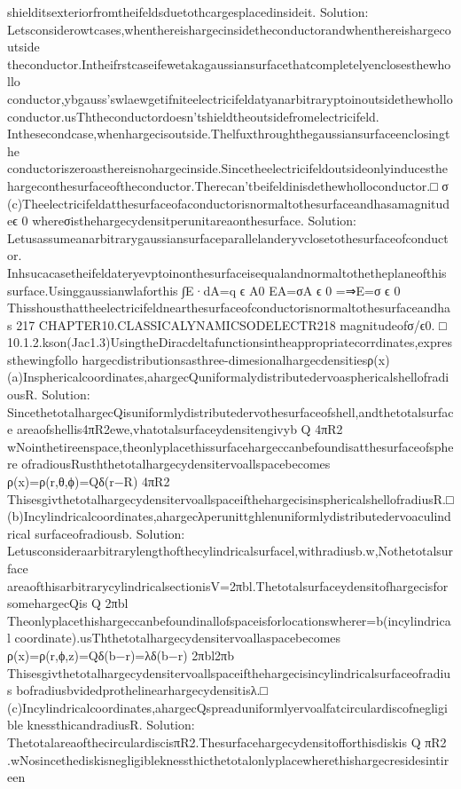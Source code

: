 {{{{{{{{{{{shielditsexteriorfromtheifeldsduetothcargesplacedinsideit.
Solution:
Letsconsiderowtcases,whenthereishargecinsidetheconductorandwhenthereishargecoutside
theconductor.Intheifrstcaseifewetakagaussiansurfacethatcompletelyenclosesthewhollo
conductor,ybgauss’swlaewgetifniteelectricifeldatyanarbitraryptoinoutsidethewhollo
conductor.usThtheconductordoesn’tshieldtheoutsidefromelectricifeld.
Inthesecondcase,whenhargecisoutside.Thelfuxthroughthegaussiansurfaceenclosingthe
conductoriszeroasthereisnohargecinside.Sincetheelectricifeldoutsideonlyinducesthe
hargeconthesurfaceoftheconductor.Therecan’tbeifeldinisdethewholloconductor.□
σ
(c)Theelectricifeldatthesurfaceofaconductorisnormaltothesurfaceandhasamagnitudeϵ
0
whereσisthehargecydensitperunitareaonthesurface.
Solution:
Letusassumeanarbitrarygaussiansurfaceparallelanderyvclosetothesurfaceofconductor.
Inhsucacasetheifeldateryevptoinonthesurfaceisequalandnormaltothetheplaneofthis
surface.Usinggaussianwlaforthis
∫E·dA=q
ϵ
A0
EA=σA
ϵ
0
=⇒E=σ
ϵ
0
Thisshousthattheelectricifeldnearthesurfaceofconductorisnormaltothesurfaceandhas
217
CHAPTER10.CLASSICALYNAMICSODELECTR218
magnitudeofσ/ϵ0.
□
10.1.2.kson(Jac1.3)UsingtheDiracdeltafunctionsintheappropriatecorrdinates,expressthewingfollo
hargecdistributionsasthree-dimesionalhargecdensitiesρ(x)
(a)Insphericalcoordinates,ahargecQuniformalydistributedervoasphericalshellofradiousR.
Solution:
SincethetotalhargecQisuniformlydistributedervothesurfaceofshell,andthetotalsurface
areaofshellis4πR2ewe,vhatotalsurfaceydensitengivyb
Q
4πR2
wNointhetireenspace,theonlyplacethissurfacehargeccanbefoundisatthesurfaceofsphere
ofradiousRusththetotalhargecydensitervoallspacebecomes
ρ(x)=ρ(r,θ,ϕ)=Qδ(r−R)
4πR2
ThisesgivthetotalhargecydensitervoallspaceifthehargecisinsphericalshellofradiusR.□
(b)Incylindricalcoordinates,ahargecλperunittghlenuniformlydistributedervoaculindrical
surfaceofradiousb.
Solution:
Letusconsideraarbitrarylengthofthecylindricalsurfacel,withradiusb.w,Nothetotalsurface
areaofthisarbitrarycylindricalsectionisV=2πbl.Thetotalsurfaceydensitofhargecisfor
somehargecQis
Q
2πbl
Theonlyplacethishargeccanbefoundinallofspaceisforlocationswherer=b(incylindrical
coordinate).usThthetotalhargecydensitervoallaspacebecomes
ρ(x)=ρ(r,ϕ,z)=Qδ(b−r)=λδ(b−r)
2πbl2πb
Thisesgivthetotalhargecydensitervoallspaceifthehargecisincylindricalsurfaceofradius
bofradiusbvidedprothelinearhargecydensitisλ.□
(c)Incylindricalcoordinates,ahargecQspreaduniformlyervoalfatcirculardiscofnegligible
knessthicandradiusR.
Solution:
ThetotalareaofthecirculardiscisπR2.Thesurfacehargecydensitofforthisdiskis
Q
πR2
.wNosincethediskisnegligibleknessthicthetotalonlyplacewherethishargecresidesintireen
}}}}}}}}}}}
